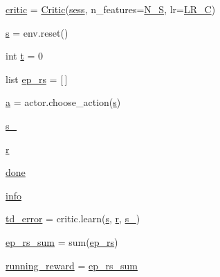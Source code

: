 \begin{DoxyCompactItemize}
\item 
\hyperlink{namespaceddpg__others_a02a9cd4813c0b89d52754744bb297310}{critic} = \hyperlink{classddpg__others_1_1_critic}{Critic}(\hyperlink{namespaceddpg__others_a88947f5e132c9538f8d4ce16004711ca}{sess}, n\+\_\+features=\hyperlink{namespaceddpg__others_a085e3af0235a4184f14e45c40242542c}{N\+\_\+S}, lr=\hyperlink{namespaceddpg__others_af9a7b0578b28ea38c337e8db55f0bb7e}{L\+R\+\_\+C})
\item 
\hyperlink{namespaceddpg__others_a2e657d9112433f7acfe9a28c8e7ce79a}{s} = env.\+reset()
\item 
int \hyperlink{namespaceddpg__others_aee1bec6a64f3215b28552758ee87bfc6}{t} = 0
\item 
list \hyperlink{namespaceddpg__others_a8b02d06c3efd8c65bd22c59b0be4046a}{ep\+\_\+rs} = \mbox{[}$\,$\mbox{]}
\item 
\hyperlink{namespaceddpg__others_a5074dd5702ee1c582994c8544c0ac4f1}{a} = actor.\+choose\+\_\+action(\hyperlink{namespaceddpg__others_a2e657d9112433f7acfe9a28c8e7ce79a}{s})
\item 
\hyperlink{namespaceddpg__others_a9401d5decfd243fdd11c64d512501ff1}{s\+\_\+}
\item 
\hyperlink{namespaceddpg__others_a05079a0e5b9b284648a5e279d844fc34}{r}
\item 
\hyperlink{namespaceddpg__others_ae2aa87b119af7536ff9c20bd0bcba552}{done}
\item 
\hyperlink{namespaceddpg__others_a906ea017b3e79f8b9791285c30773671}{info}
\item 
\hyperlink{namespaceddpg__others_ab3de6bd8c4c05cda51f8fb396eb255d8}{td\+\_\+error} = critic.\+learn(\hyperlink{namespaceddpg__others_a2e657d9112433f7acfe9a28c8e7ce79a}{s}, \hyperlink{namespaceddpg__others_a05079a0e5b9b284648a5e279d844fc34}{r}, \hyperlink{namespaceddpg__others_a9401d5decfd243fdd11c64d512501ff1}{s\+\_\+})
\item 
\hyperlink{namespaceddpg__others_ae0eea715ecb8dfc45dfea85e23ff27ad}{ep\+\_\+rs\+\_\+sum} = sum(\hyperlink{namespaceddpg__others_a8b02d06c3efd8c65bd22c59b0be4046a}{ep\+\_\+rs})
\item 
\hyperlink{namespaceddpg__others_a98714db748bdf3f1566b42ed000f7365}{running\+\_\+reward} = \hyperlink{namespaceddpg__others_ae0eea715ecb8dfc45dfea85e23ff27ad}{ep\+\_\+rs\+\_\+sum}
\end{DoxyCompactItemize}


